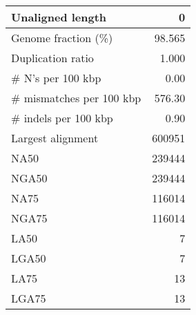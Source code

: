 \documentclass[12pt,a4paper]{article}
\begin{document}
\begin{table}[ht]
\begin{center}
\begin{tabular}{|l*{1}{|r}|}
Unaligned length & 0 \\ \hline
Genome fraction (\%) & 98.565 \\ \hline
Duplication ratio & 1.000 \\ \hline
\# N's per 100 kbp & 0.00 \\ \hline
\# mismatches per 100 kbp & 576.30 \\ \hline
\# indels per 100 kbp & 0.90 \\ \hline
Largest alignment & 600951 \\ \hline
NA50 & 239444 \\ \hline
NGA50 & 239444 \\ \hline
NA75 & 116014 \\ \hline
NGA75 & 116014 \\ \hline
LA50 & 7 \\ \hline
LGA50 & 7 \\ \hline
LA75 & 13 \\ \hline
LGA75 & 13 \\ \hline
\end{tabular}
\end{center}
\end{table}
\end{document}

